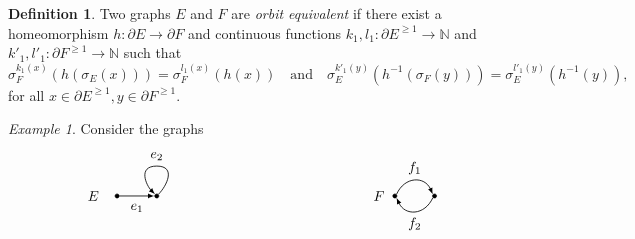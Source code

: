 \documentclass[12pt, a4paper]{amsart}
\numberwithin{equation}{section}
\theoremstyle{definition}
\newtheorem{definition}[thm]{Definition}
\theoremstyle{remark}
\newtheorem{example}[thm]{Example}
\begin{document}
\begin{definition}\label{def: cont orb equiv}
Two graphs $E$ and $F$ are {\em orbit equivalent} if there 
exist a homeomorphism $h:\partial E\to \partial F$ and continuous functions 
$k_1,l_1:\partial E^{\ge 1}\to {\mathbb{N}}$ and $k'_1,l'_1:\partial F^{\ge 1}\to {\mathbb{N}}$ 
such that 
\begin{equation}\label{eq: con orb equiv}
\sigma_F^{k_1(x)}(h(\sigma_E(x)))=\sigma_F^{l_1(x)}(h(x))\quad\text{and}\quad\sigma_E^{k'_1(y)}(h^{-1}(\sigma_F(y)))=\sigma_E^{l'_1(y)}(h^{-1}(y)),
\end{equation}
for all $x\in\partial E^{\ge 1}, y\in \partial F^{\ge 1}$.
\end{definition}

\begin{example}\label{ex: coe but not conjugacy}
Consider the graphs
\[
\begin{tikzpicture}
    
    {
        \node[inner sep=0pt, circle, fill=black] (11) at (0,0)
        [draw] {.}; 
 }
    
    {
        \node[inner sep=0pt, circle, fill=black] (21) at (1,0)
        [draw] {.}; 
 }
    
    
    
    {
        \node[inner sep=0pt, circle, fill=black] (51) at (7,0)
        [draw] {.}; 
 }
    
    {
        \node[inner sep=0pt, circle, fill=black] (61) at (8,0)
        [draw] {.}; 
 }
    
    
    
\node at (-0.6,0) {$E$};
\node at (6.6,0) {$F$};

\node at (0.5,-0.3) {$e_1$};

\node at (1,1) {$e_2$};

\node at (7.5,0.7) {$f_1$};
\node at (7.5,-0.7) {$f_2$};

\draw[style=semithick, -latex] (11.east)--(21.west);

\draw[style=semithick, -latex] (51.north east)
.. controls (7.25,0.5) and (7.75,0.5).. (61.north west);
\draw[style=semithick, -latex] (61.south west)
.. controls (7.75,-0.5) and (7.25,-0.5).. (51.south east);

    
\draw[style=semithick, -latex] (21.north east)
        .. controls (1.25,0.25) and (1.5,0.75) ..
        (1,0.75)
        .. controls (0.5,0.75) and (0.75,0.25) ..
        (21.north west);
        

\end{tikzpicture}\]
\end{example}
\end{document}
